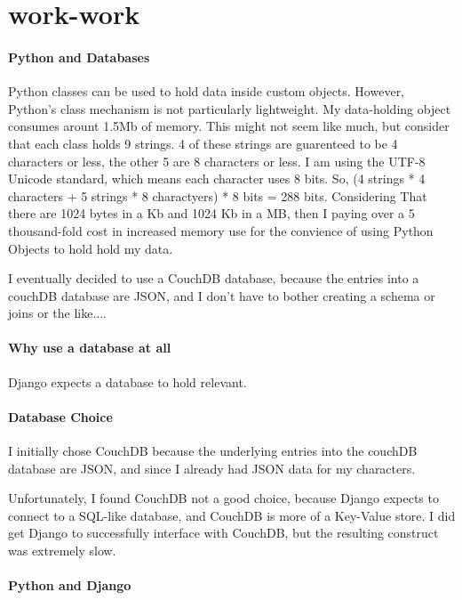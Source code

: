 \chapter{work-work}



\subsubsection{Python and Databases}
Python classes can be used to hold data inside custom objects.  However, Python's class mechanism is not particularly lightweight.  My data-holding object consumes arount 1.5Mb of memory.  This might not seem like much, but consider that each class holds 9 strings.  4 of these strings are guarenteed to be 4 characters or less, the other 5 are 8 characters or less.  I am using the UTF-8 Unicode standard, which means each character uses 8 bits.  So, (4 strings * 4 characters + 5 strings * 8 charactyers) * 8 bits = 288 bits.  Considering That there are 1024 bytes in a Kb and 1024 Kb in a MB, then I paying over a 5 thousand-fold cost in increased memory use for the convience of using Python Objects to hold hold my data.

I eventually decided to use a CouchDB database, because the entries into a couchDB database are JSON, and I don't have to bother creating a schema or joins or the like....


\subsubsection{Why use a database at all}

Django expects a database to hold relevant.

\subsubsection{Database Choice}

I initially chose CouchDB because the underlying entries into the couchDB database are JSON, and since I already had JSON data for my characters.

Unfortunately, I found CouchDB not a good choice, because Django expects to connect to a SQL-like database, and CouchDB is more of a Key-Value store.  I did get Django to successfully interface with CouchDB, but the resulting construct was extremely slow.



\subsubsection{Python and Django}

